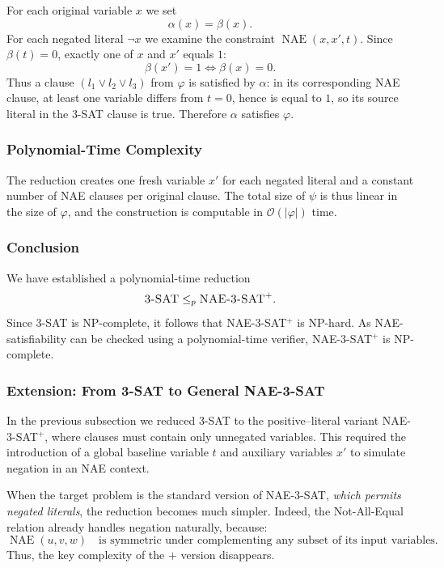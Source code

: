 \documentclass[9pt]{extarticle}
\begin{document}
For each original variable $x$ we set
\[
    \alpha(x) = \beta(x).
\]
For each negated literal $\neg x$ we examine the constraint
$\operatorname{NAE}(x,x',t)$.  Since $\beta(t)=0$, exactly one of $x$ and $x'$
equals $1$:
\[
\beta(x') = 1 \iff \beta(x) = 0.
\]
Thus a clause $(l_1 \lor l_2 \lor l_3)$ from $\varphi$ is satisfied by $\alpha$:
in its corresponding NAE clause, at least one variable differs from $t=0$, hence
is equal to $1$, so its source literal in the 3-SAT clause is true.  Therefore
$\alpha$ satisfies $\varphi$.

\subsubsection*{Polynomial-Time Complexity}

The reduction creates one fresh variable $x'$ for each negated literal and a
constant number of NAE clauses per original clause.  The total size of $\psi$ is
thus linear in the size of $\varphi$, and the construction is computable in
$\mathcal{O}(|\varphi|)$ time.

\subsubsection*{Conclusion}

We have established a polynomial-time reduction
\[
    \textsc{3-SAT} \le_p \textsc{NAE-3-SAT}^+.
\]
Since \textsc{3-SAT} is NP-complete, it follows that \textsc{NAE-3-SAT}$^+$ is
NP-hard.  As NAE-satisfiability can be checked using a polynomial-time verifier,
\textsc{NAE-3-SAT}$^+$ is NP-complete.
\subsubsection*{Extension: From \textsc{3-SAT} to General \textsc{NAE-3-SAT}}

In the previous subsection we reduced \textsc{3-SAT} to the positive–literal
variant \textsc{NAE-3-SAT}$^+$, where clauses must contain only unnegated
variables.  This required the introduction of a global baseline variable $t$ and
auxiliary variables $x'$ to simulate negation in an NAE context.

When the target problem is the standard version of \textsc{NAE-3-SAT},
\emph{which permits negated literals}, the reduction becomes much simpler.
Indeed, the Not-All-Equal relation already handles negation naturally, because:
\[
\operatorname{NAE}(u,v,w) \quad\text{is symmetric under complementing any
subset of its input variables.}
\]
Thus, the key complexity of the $+$ version disappears.
\end{document}
